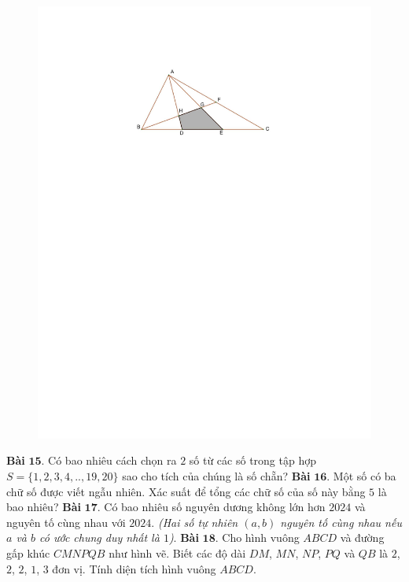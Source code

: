 \begin{multicols}{2}
\begin{figure}[H]
		\includegraphics[width= 1\linewidth]{bai14k2}
		\vspace*{-10pt}
	\end{figure}
	\textbf{\color{toancuabi}Bài} $\pmb{15.}$ Có bao nhiêu cách chọn ra $2$ số từ các số trong tập hợp $S=\{1,2,3,4,..,19,20\}$ sao cho tích của chúng là số chẵn?
	\vskip 0.1cm
	\textbf{\color{toancuabi}Bài} $\pmb{16.}$  Một số có ba chữ số được viết ngẫu nhiên. Xác suất để tổng các chữ số của số này bằng $5$ là bao nhiêu?
	\vskip 0.1cm
	\textbf{\color{toancuabi}Bài} $\pmb{17.}$ Có bao nhiêu số nguyên dương không lớn hơn $2024$ và nguyên tố cùng nhau với $2024$.
	\vskip 0.1cm
	\textit{(Hai số tự nhiên $(a,b)$ nguyên tố cùng nhau nếu $a$ và $b$ có ước chung duy nhất là $1$)}.
	\vskip 0.1cm
	\textbf{\color{toancuabi}Bài} $\pmb{18.}$ Cho hình vuông $ABCD$ và đường gấp khúc $CMNPQB$ như hình vẽ. Biết các độ dài $DM$, $MN$,
	$NP$, $PQ$ và $QB$ là $2$, $2$, $2$, $1$, $3$ đơn vị. Tính diện tích
	hình vuông $ABCD$.
	\begin{figure}[H]

\end{figure}
\end{multicols}
